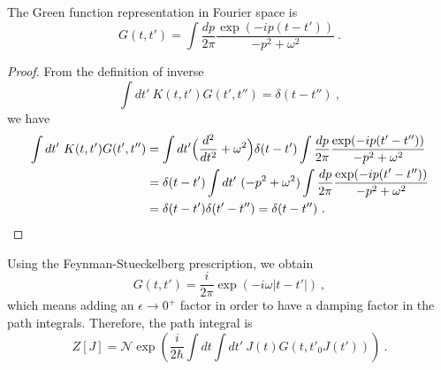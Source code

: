     The Green function representation in Fourier space is 
    \begin{equation*}
        G(t, t') = \int \frac{dp}{2\pi} \frac{\exp(- i p (t - t'))}{-p^2 + \omega^2} ~.
    \end{equation*}
    \begin{proof}
        From the definition of inverse
        \begin{equation*}
            \int dt' ~ K(t, t') G(t', t'') = \delta (t - t'') ~,
        \end{equation*}
        we have 
        \begin{equation*}
        \begin{aligned}
            \int dt' ~ K(t, t') G(t', t'') & = \int dt' \Big (\frac{d^2}{dt^2} + \omega^2 \Big) \delta (t - t')  \int \frac{dp}{2\pi} \frac{\exp(- i p (t' - t''))}{-p^2 + \omega^2} \\ & = \delta (t - t') \int dt' ~ ( -p^2 + \omega^2 ) \int \frac{dp}{2\pi} \frac{\exp(- i p (t' - t''))}{-p^2 + \omega^2} \\ & =  \delta (t - t') \delta (t' - t'') = \delta (t - t'') ~.
        \end{aligned}
        \end{equation*}
    \end{proof}
    Using the Feynman-Stueckelberg prescription, we obtain 
    \begin{equation*}
        G(t, t') = \frac{i}{2\pi} \exp(- i \omega |t - t'|) ~,
    \end{equation*}
    which means adding an $\epsilon \rightarrow 0^+$ factor in order to have a damping factor in the path integrals. Therefore, the path integral is  
    \begin{equation*}
        Z[J] = \mathcal N \exp(\frac{i}{2\hbar} \int dt \int dt' ~ J(t) G(t, t'_0 J(t'))) ~.
    \end{equation*}
